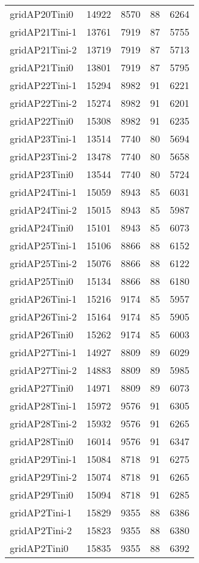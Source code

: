 \begin{longtable}{lrrrr}
gridAP20Tini0 & 14922 & 8570 & 88 & 6264 \\
gridAP21Tini-1 & 13761 & 7919 & 87 & 5755 \\
gridAP21Tini-2 & 13719 & 7919 & 87 & 5713 \\
gridAP21Tini0 & 13801 & 7919 & 87 & 5795 \\
gridAP22Tini-1 & 15294 & 8982 & 91 & 6221 \\
gridAP22Tini-2 & 15274 & 8982 & 91 & 6201 \\
gridAP22Tini0 & 15308 & 8982 & 91 & 6235 \\
gridAP23Tini-1 & 13514 & 7740 & 80 & 5694 \\
gridAP23Tini-2 & 13478 & 7740 & 80 & 5658 \\
gridAP23Tini0 & 13544 & 7740 & 80 & 5724 \\
gridAP24Tini-1 & 15059 & 8943 & 85 & 6031 \\
gridAP24Tini-2 & 15015 & 8943 & 85 & 5987 \\
gridAP24Tini0 & 15101 & 8943 & 85 & 6073 \\
gridAP25Tini-1 & 15106 & 8866 & 88 & 6152 \\
gridAP25Tini-2 & 15076 & 8866 & 88 & 6122 \\
gridAP25Tini0 & 15134 & 8866 & 88 & 6180 \\
gridAP26Tini-1 & 15216 & 9174 & 85 & 5957 \\
gridAP26Tini-2 & 15164 & 9174 & 85 & 5905 \\
gridAP26Tini0 & 15262 & 9174 & 85 & 6003 \\
gridAP27Tini-1 & 14927 & 8809 & 89 & 6029 \\
gridAP27Tini-2 & 14883 & 8809 & 89 & 5985 \\
gridAP27Tini0 & 14971 & 8809 & 89 & 6073 \\
gridAP28Tini-1 & 15972 & 9576 & 91 & 6305 \\
gridAP28Tini-2 & 15932 & 9576 & 91 & 6265 \\
gridAP28Tini0 & 16014 & 9576 & 91 & 6347 \\
gridAP29Tini-1 & 15084 & 8718 & 91 & 6275 \\
gridAP29Tini-2 & 15074 & 8718 & 91 & 6265 \\
gridAP29Tini0 & 15094 & 8718 & 91 & 6285 \\
gridAP2Tini-1 & 15829 & 9355 & 88 & 6386 \\
gridAP2Tini-2 & 15823 & 9355 & 88 & 6380 \\
gridAP2Tini0 & 15835 & 9355 & 88 & 6392 \\

\end{longtable}
